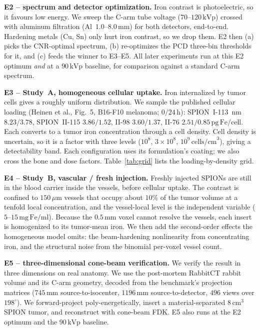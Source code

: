 \documentclass[]{spie}  %
\begin{document}
\textbf{E2 -- spectrum and detector optimization.} Iron contrast is photoelectric,
so it favours low energy. We sweep the C-arm tube voltage ($70$--$120\,\mathrm{kVp}$)
crossed with aluminum filtration (Al~$1.0$--$8.0\,\mathrm{mm}$) for both detectors,
end-to-end. Hardening metals (Cu, Sn) only hurt iron contrast, so we drop them. E2
then (a) picks the CNR-optimal spectrum, (b) re-optimizes the PCD three-bin
thresholds for it, and (c) feeds the winner to E3--E5. All later experiments run at
this E2 optimum \emph{and} at a $90\,\mathrm{kVp}$ baseline, for comparison against a
standard C-arm spectrum.

\textbf{E3 -- Study~A, homogeneous cellular uptake.} Iron internalized by tumor
cells gives a roughly uniform distribution. We sample the published
cellular loading (Heinen et al., Fig.~5, B16-F10 melanoma; $0/24\,\mathrm{h}$):
SPION~I-113~nm $8.23/3.78$, SPION~II-115 $3.86/1.52$, II-98 $3.60/1.37$,
II-76 $2.51/0.85\,\mathrm{pg\,Fe/cell}$. Each converts to a tumor iron concentration
through a cell density. Cell density is uncertain, so it is a factor with three
levels ($10^8$, $3\times10^8$, $10^9\,\mathrm{cells/cm}^3$), giving a detectability
band. Each configuration uses its formulation's coating; we also cross the bone and
dose factors. Table~\ref{tab:grid} lists the loading-by-density grid.

\textbf{E4 -- Study~B, vascular / fresh injection.} Freshly injected SPIONs are still
in the blood carrier inside the vessels, before cellular uptake. The contrast is
confined to $150\,\mu\mathrm{m}$ vessels that occupy about $10\%$ of the tumor volume
at a tenfold local concentration, and the vessel-local level is the independent
variable ($5$--$15\,\mathrm{mg\,Fe/ml}$). Because the $0.5\,\mathrm{mm}$ voxel cannot
resolve the vessels, each insert is homogenized to its tumor-mean iron. We then add
the second-order effects the homogeneous model omits: the beam-hardening nonlinearity
from concentrating iron, and the structural noise from the binomial per-voxel vessel
count.

\textbf{E5 -- three-dimensional cone-beam verification.} We verify the result in
three dimensions on real anatomy. We use the post-mortem RabbitCT rabbit
volume\cite{Rohkohl2009} and its C-arm geometry, decoded from the benchmark's
projection matrices ($745\,\mathrm{mm}$ source-to-isocenter, $1196\,\mathrm{mm}$
source-to-detector, $496$ views over $198^\circ$). We forward-project
poly-energetically, insert a material-separated $8\,\mathrm{cm}^3$ SPION tumor, and
reconstruct with cone-beam FDK. E5 also runs at the E2 optimum and the
$90\,\mathrm{kVp}$ baseline.
\end{document}
